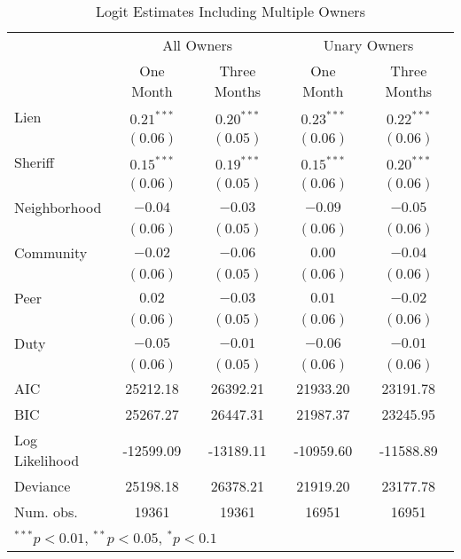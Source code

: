 \begin{table}[htbp]
\caption{Logit Estimates Including Multiple Owners}
\begin{center}
\begin{tabular}{l c c c c }
\hline
 & \multicolumn{2}{c}{All Owners} & \multicolumn{2}{c}{Unary Owners} \\
 & One Month & Three Months & One Month & Three Months \\
\hline
Lien           & $0.21^{***}$ & $0.20^{***}$ & $0.23^{***}$ & $0.22^{***}$ \\
               & $(0.06)$     & $(0.05)$     & $(0.06)$     & $(0.06)$     \\
Sheriff        & $0.15^{***}$ & $0.19^{***}$ & $0.15^{***}$ & $0.20^{***}$ \\
               & $(0.06)$     & $(0.05)$     & $(0.06)$     & $(0.06)$     \\
Neighborhood   & $-0.04$      & $-0.03$      & $-0.09$      & $-0.05$      \\
               & $(0.06)$     & $(0.05)$     & $(0.06)$     & $(0.06)$     \\
Community      & $-0.02$      & $-0.06$      & $0.00$       & $-0.04$      \\
               & $(0.06)$     & $(0.05)$     & $(0.06)$     & $(0.06)$     \\
Peer           & $0.02$       & $-0.03$      & $0.01$       & $-0.02$      \\
               & $(0.06)$     & $(0.05)$     & $(0.06)$     & $(0.06)$     \\
Duty           & $-0.05$      & $-0.01$      & $-0.06$      & $-0.01$      \\
               & $(0.06)$     & $(0.05)$     & $(0.06)$     & $(0.06)$     \\
\hline
AIC            & 25212.18     & 26392.21     & 21933.20     & 23191.78     \\
BIC            & 25267.27     & 26447.31     & 21987.37     & 23245.95     \\
Log Likelihood & -12599.09    & -13189.11    & -10959.60    & -11588.89    \\
Deviance       & 25198.18     & 26378.21     & 21919.20     & 23177.78     \\
Num. obs.      & 19361        & 19361        & 16951        & 16951        \\
\hline
\multicolumn{5}{l}{\scriptsize{$^{***}p<0.01$, $^{**}p<0.05$, $^*p<0.1$}}
\end{tabular}
\label{sh_logit_rob}
\end{center}
\end{table}
